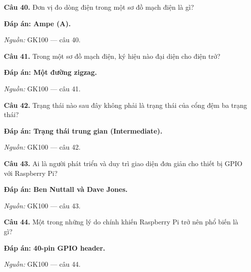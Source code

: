 \documentclass[11pt,a4paper]{article}
\begin{document}
\textbf{Câu 40.} Đơn vị đo dòng điện trong một sơ đồ mạch điện là gì?\par
{\color{answer}\textbf{Đáp án: Ampe (A).}}\par
{\footnotesize\color{sourcegray}\textit{Nguồn:} GK100 — câu 40.\par}
\vspace{3pt}\par\noindent{\color{black!18}\rule{\linewidth}{0.3pt}}\par\medskip

\textbf{Câu 41.} Trong một sơ đồ mạch điện, ký hiệu nào đại diện cho điện trở?\par
{\color{answer}\textbf{Đáp án: Một đường zigzag.}}\par
{\footnotesize\color{sourcegray}\textit{Nguồn:} GK100 — câu 41.\par}
\vspace{3pt}\par\noindent{\color{black!18}\rule{\linewidth}{0.3pt}}\par\medskip

\textbf{Câu 42.} Trạng thái nào sau đây không phải là trạng thái của cổng đệm ba trạng thái?\par
{\color{answer}\textbf{Đáp án: Trạng thái trung gian (Intermediate).}}\par
{\footnotesize\color{sourcegray}\textit{Nguồn:} GK100 — câu 42.\par}
\vspace{3pt}\par\noindent{\color{black!18}\rule{\linewidth}{0.3pt}}\par\medskip

\textbf{Câu 43.} Ai là người phát triển và duy trì giao diện đơn giản cho thiết bị GPIO với Raspberry Pi?\par
{\color{answer}\textbf{Đáp án: Ben Nuttall và Dave Jones.}}\par
{\footnotesize\color{sourcegray}\textit{Nguồn:} GK100 — câu 43.\par}
\vspace{3pt}\par\noindent{\color{black!18}\rule{\linewidth}{0.3pt}}\par\medskip

\textbf{Câu 44.} Một trong những lý do chính khiến Raspberry Pi trở nên phổ biến là gì?\par
{\color{answer}\textbf{Đáp án: 40-pin GPIO header.}}\par
{\footnotesize\color{sourcegray}\textit{Nguồn:} GK100 — câu 44.\par}
\vspace{3pt}\par\noindent{\color{black!18}\rule{\linewidth}{0.3pt}}\par\medskip
\end{document}
